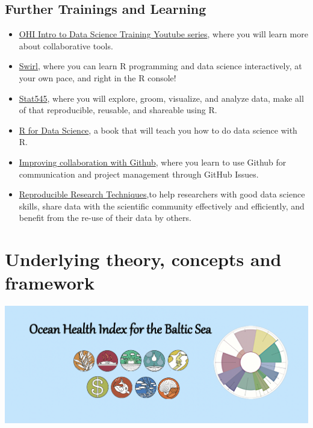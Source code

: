 \documentclass[
]{book}
\providecommand{\tightlist}{%
  \setlength{\itemsep}{0pt}\setlength{\parskip}{0pt}}
\begin{document}
\hypertarget{further-trainings-and-learning}{%
\section*{Further Trainings and Learning}\label{further-trainings-and-learning}}

\begin{itemize}
\tightlist
\item
  \href{https://youtube.com/playlist?list=PLX7J3qtjcll_4s2oaKHuWdRdBMJz7tBAU\&si=NIoCjH-AuOM-rWkI}{OHI Intro to Data Science Training Youtube series}, where you will learn more about collaborative tools.
\item
  \href{https://swirlstats.com/}{Swirl}, where you can learn R programming and data science interactively, at your own pace, and right in the R console!
\item
  \href{https://stat545.com}{Stat545}, where you will explore, groom, visualize, and analyze data, make all of that reproducible, reusable, and shareable using R.
\item
  \href{https://r4ds.hadley.nz}{R for Data Science}, a book that will teach you how to do data science with R.
\item
  \href{https://openscapes.github.io/series/core-lessons/github/github-issues.html}{Improving collaboration with Github}, where you learn to use Github for communication and project management through GitHub Issues.
\item
  \href{https://learning.nceas.ucsb.edu/2021-11-RRCourse/}{Reproducible Research Techniques},to help researchers with good data science skills, share data with the scientific community effectively and efficiently, and benefit from the re-use of their data by others.
\end{itemize}

\hypertarget{underlying-theory-concepts-and-framework}{%
\chapter{Underlying theory, concepts and framework}\label{underlying-theory-concepts-and-framework}}

\includegraphics[width=800px]{_book/_main_files/figure-html/twitter_pic}
\end{document}
